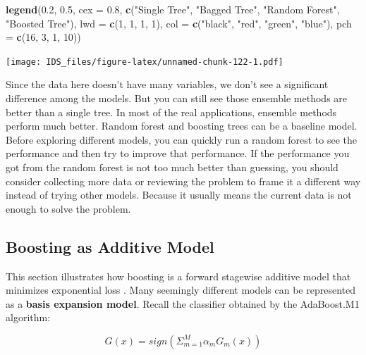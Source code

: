 \documentclass[12pt,]{krantz}
\makeatletter
\newenvironment{Shaded}{\begin{snugshade}}{\end{snugshade}}
\newcommand{\DataTypeTok}[1]{\textcolor[rgb]{0.27,0.27,0.27}{#1}}
\newcommand{\DecValTok}[1]{\textcolor[rgb]{0.06,0.06,0.06}{#1}}
\newcommand{\FloatTok}[1]{\textcolor[rgb]{0.06,0.06,0.06}{#1}}
\newcommand{\KeywordTok}[1]{\textcolor[rgb]{0.27,0.27,0.27}{\textbf{#1}}}
\newcommand{\NormalTok}[1]{#1}
\newcommand{\StringTok}[1]{\textcolor[rgb]{0.5,0.5,0.5}{#1}}
\newenvironment{kframe}{%
\medskip{}
\setlength{\fboxsep}{.8em}
 \def\at@end@of@kframe{}%
 \ifinner\ifhmode%
  \def\at@end@of@kframe{\end{minipage}}%
  \begin{minipage}{\columnwidth}%
 \fi\fi%
 \def\FrameCommand##1{\hskip\@totalleftmargin \hskip-\fboxsep
 \colorbox{shadecolor}{##1}\hskip-\fboxsep
     \hskip-\linewidth \hskip-\@totalleftmargin \hskip\columnwidth}%
 \MakeFramed {\advance\hsize-\width
   \@totalleftmargin\z@ \linewidth\hsize
   \@setminipage}}%
 {\par\unskip\endMakeFramed%
 \at@end@of@kframe}
\renewenvironment{Shaded}{\begin{kframe}}{\end{kframe}}
\makeatother
\begin{document}
\begin{Shaded}
\begin{Highlighting}[]
\KeywordTok{legend}\NormalTok{(}\FloatTok{0.2}\NormalTok{, }\FloatTok{0.5}\NormalTok{, }\DataTypeTok{cex =} \FloatTok{0.8}\NormalTok{,}
       \KeywordTok{c}\NormalTok{(}\StringTok{"Single Tree"}\NormalTok{, }\StringTok{"Bagged Tree"}\NormalTok{, }\StringTok{"Random Forest"}\NormalTok{, }\StringTok{"Boosted Tree"}\NormalTok{),}
       \DataTypeTok{lwd =} \KeywordTok{c}\NormalTok{(}\DecValTok{1}\NormalTok{, }\DecValTok{1}\NormalTok{, }\DecValTok{1}\NormalTok{, }\DecValTok{1}\NormalTok{),}
       \DataTypeTok{col =} \KeywordTok{c}\NormalTok{(}\StringTok{"black"}\NormalTok{, }\StringTok{"red"}\NormalTok{, }\StringTok{"green"}\NormalTok{, }\StringTok{"blue"}\NormalTok{),}
       \DataTypeTok{pch =} \KeywordTok{c}\NormalTok{(}\DecValTok{16}\NormalTok{, }\DecValTok{3}\NormalTok{, }\DecValTok{1}\NormalTok{, }\DecValTok{10}\NormalTok{))}
\end{Highlighting}
\end{Shaded}

\texttt{[image: IDS\_files/figure-latex/unnamed-chunk-122-1.pdf]}

Since the data here doesn't have many variables, we don't see a significant difference among the models. But you can still see those ensemble methods are better than a single tree. In most of the real applications, ensemble methods perform much better. Random forest and boosting trees can be a baseline model. Before exploring different models, you can quickly run a random forest to see the performance and then try to improve that performance. If the performance you got from the random forest is not too much better than guessing, you should consider collecting more data or reviewing the problem to frame it a different way instead of trying other models. Because it usually means the current data is not enough to solve the problem.

\hypertarget{boosting-as-additive-model}{%
\subsection{Boosting as Additive Model}\label{boosting-as-additive-model}}

This section illustrates how boosting is a forward stagewise additive model that minimizes exponential loss \citep{Friedman2000}. Many seemingly different models can be represented as a \textbf{basis expansion model}. Recall the classifier obtained by the AdaBoost.M1 algorithm:

\[G(x)=sign ( \Sigma_{m=1}^M \alpha_{m}G_m(x))\]
\end{document}
